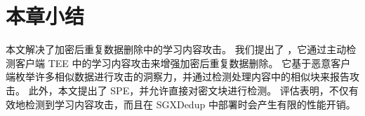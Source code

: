 \section{本章小结}
\label{sec:featurespy-conclusion}
本文解决了加密后重复数据删除中的学习内容攻击。 我们提出了 \sysnameF，它通过主动检测客户端 TEE 中的学习内容攻击来增强加密后重复数据删除。 它基于恶意客户端枚举许多相似数据进行攻击的洞察力，并通过检测处理内容中的相似块来报告攻击。 此外，本文提出了 SPE，并允许直接对密文块进行检测。 评估表明，\sysnameF 不仅有效地检测到学习内容攻击，而且在 SGXDedup \cite{ren21} 中部署时会产生有限的性能开销。
